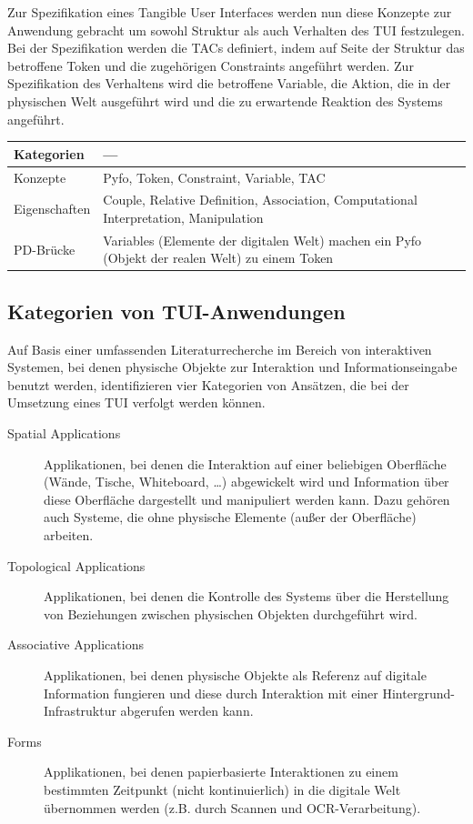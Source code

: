 Zur Spezifikation eines Tangible User Interfaces werden nun diese Konzepte zur Anwendung gebracht um sowohl Struktur als auch Verhalten des \gls{TUI} festzulegen. Bei der Spezifikation werden die \glspl{TAC} definiert, indem auf Seite der Struktur das betroffene Token und die zugehörigen Constraints angeführt werden. Zur Spezifikation des Verhaltens wird die betroffene Variable, die Aktion, die in der physischen Welt ausgeführt wird und die zu erwartende Reaktion des Systems angeführt.
\\[1em]
\begin{tabular}{| p{3cm} | p{10cm} |}
  \hline
  Kategorien & --- \\ \hline
  Konzepte & Pyfo, Token, Constraint, Variable, \gls{TAC} \\ \hline
  Eigenschaften & Couple, Relative Definition, Association, Computational Interpretation, Manipulation \\ \hline
  PD-Brücke & Variables (Elemente der digitalen Welt) machen ein Pyfo (Objekt der realen Welt) zu einem Token \\ \hline
\end{tabular} 


\subsection{Kategorien von TUI-Anwendungen} %
\label{sub:kategorien_von_tui_anwendungen}

Auf Basis einer umfassenden Literaturrecherche im Bereich von interaktiven Systemen, bei denen physische Objekte zur Interaktion und Informationseingabe benutzt werden, identifizieren \citet{Klemmer04} vier Kategorien von Ansätzen, die bei der Umsetzung eines \gls{TUI} verfolgt werden können. 

\begin{description}
	\item[Spatial Applications] Applikationen, bei denen die Interaktion auf einer beliebigen Oberfläche (Wände, Tische, Whiteboard, \ldots) abgewickelt wird und Information über diese Oberfläche dargestellt und manipuliert werden kann. Dazu gehören auch Systeme, die ohne physische Elemente (außer der Oberfläche) arbeiten.
	\item[Topological Applications] Applikationen, bei denen die Kontrolle des Systems über die Herstellung von Beziehungen zwischen physischen Objekten durchgeführt wird.
	\item[Associative Applications] Applikationen, bei denen physische Objekte als Referenz auf digitale Information fungieren und diese durch Interaktion mit einer Hintergrund-Infrastruktur abgerufen werden kann.
	\item[Forms] Applikationen, bei denen papierbasierte Interaktionen zu einem bestimmten Zeitpunkt (nicht kontinuierlich) in die digitale Welt übernommen werden (z.B. durch Scannen und \gls{OCR}-Verarbeitung).
\end{description}

